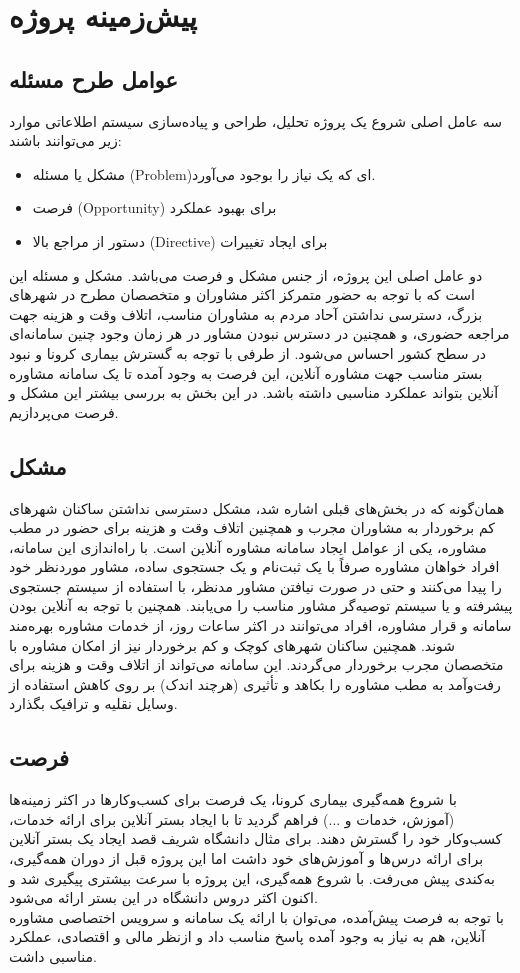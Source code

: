 \section{پیش‌زمینه پروژه}
\subsection{عوامل طرح مسئله}
سه عامل اصلی شروع یک پروژه تحلیل، طراحی و پیاده‌سازی سیستم اطلاعاتی موارد زیر می‌توانند ‌باشند:
\begin{itemize}
\item مشکل یا مسئله (Problem)ای که یک نیاز را بوجود می‌آورد.
\item فرصت (Opportunity) برای بهبود عملکرد
\item دستور از مراجع بالا (Directive) برای ایجاد تغییرات
\end{itemize}
دو عامل اصلی این پروژه، از جنس مشکل و فرصت می‌باشد. مشکل و مسئله این است که با توجه به حضور متمرکز اکثر مشاوران و متخصصان مطرح در شهرهای بزرگ، دسترسی نداشتن آحاد مردم به مشاوران مناسب، اتلاف وقت و هزینه جهت مراجعه حضوری، و همچنین در دسترس نبودن مشاور در هر زمان وجود چنین سامانه‌ای در سطح کشور احساس می‌شود. از طرفی با توجه به گسترش بیماری کرونا و نبود بستر مناسب جهت مشاوره آنلاین، این فرصت به وجود آمده تا یک سامانه مشاوره آنلاین بتواند عملکرد مناسبی داشته باشد. در این بخش به بررسی بیشتر این مشکل و فرصت می‌پردازیم.


\subsection{مشکل}
همان‌گونه که در بخش‌های قبلی اشاره شد، مشکل دسترسی نداشتن ساکنان شهرهای کم برخوردار به مشاوران مجرب و همچنین اتلاف وقت و هزینه برای حضور در مطب مشاوره، یکی از عوامل ایجاد سامانه مشاوره آنلاین است. با راه‌اندازی این سامانه، افراد خواهان مشاوره صرفاً با یک ثبت‌نام و یک جستجوی ساده، مشاور موردنظر خود را پیدا می‌کنند و حتی در صورت نیافتن مشاور مدنظر، با استفاده از سیستم جستجوی پیشرفته و یا سیستم توصیه‌گر مشاور مناسب را می‌یابند. همچنین با توجه به آنلاین بودن سامانه و قرار مشاوره، افراد می‌توانند در اکثر ساعات روز، از خدمات مشاوره بهره‌مند شوند. همچنین ساکنان شهرهای کوچک و کم برخوردار نیز از امکان مشاوره با متخصصان مجرب برخوردار می‌گردند. این سامانه می‌تواند از اتلاف وقت و هزینه برای رفت‌وآمد به مطب مشاوره را بکاهد و تأثیری (هرچند اندک) بر روی کاهش استفاده از وسایل نقلیه و ترافیک بگذارد.

\subsection{فرصت}
با شروع همه‌گیری بیماری کرونا، یک فرصت برای کسب‌وکارها در اکثر زمینه‌ها (آموزش، خدمات و ...) فراهم گردید تا با ایجاد بستر آنلاین برای ارائه خدمات، کسب‌وکار خود را گسترش دهند. برای مثال دانشگاه شریف قصد ایجاد یک بستر آنلاین برای ارائه درس‌ها و آموزش‌های خود داشت اما این پروژه قبل از دوران همه‌گیری، به‌کندی پیش می‌رفت. با شروع همه‌گیری، این پروژه با سرعت بیشتری پیگیری شد و اکنون اکثر دروس دانشگاه در این بستر ارائه می‌شود. \\
با توجه به فرصت پیش‌آمده، می‌توان با ارائه یک سامانه و سرویس اختصاصی مشاوره آنلاین، هم به نیاز به وجود آمده پاسخ مناسب داد و ازنظر مالی و اقتصادی، عملکرد مناسبی داشت.

